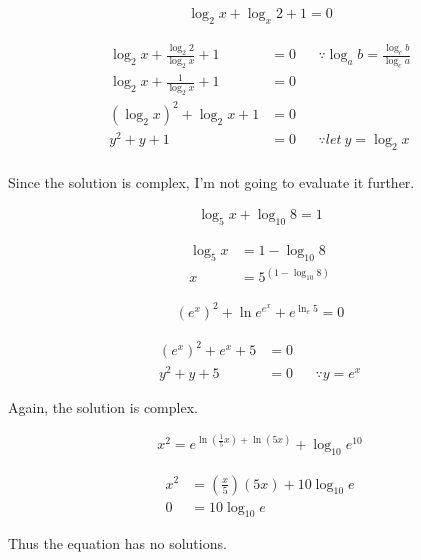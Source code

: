 \documentclass[a4paper]{article}
\begin{document}
\begin{question}
\begin{align*}
\log_2 x + \log_x 2 +1 = 0
\end{align*}
\end{question}

\begin{align*}
\log_2 x + \frac{\log_2 2}{\log_2 x} +1 &=0 && \because \log_ab = \frac{\log_c b}{\log_c a} \\
\log_2 x + \frac{1}{\log_2x} +1 &= 0 \\
(\log_2x)^2 + \log_2 x+ 1 &= 0 \\
y^2 + y + 1 &=0 && \because let\ y =\log_2 x \\
\end{align*}

Since the solution is complex, I'm not going to evaluate it further.

\begin{question}
\begin{align*}
\log_5 x+ \log_{10}8 = 1
\end{align*}
\end{question}

\begin{align*}
\log_5x &= 1- \log_{10}8 \\
x &= 5^{(1-\log_{10} 8)}
\end{align*}

\begin{question}
\begin{align*}
(e^x)^2 + \ln e^{e^x} + e^{\ln_e 5} = 0
\end{align*}
\end{question}

\begin{align*}
(e^x)^2 + e^x + 5 &= 0 \\
y^2 + y + 5 &= 0 && \because y = e^x
\end{align*}

Again, the solution is complex.

\begin{question}
\begin{align*}
x^2 = e^{\ln\left(\frac{1}{5}x\right)+ \ln(5x)} + \log_{10}e^{10}
\end{align*}
\end{question}

\begin{align*}
x^2 &= \left(\frac{x}{5}\right)(5x) + 10 \log_{10} e \\
0 &= 10\log_{10} {e}
\end{align*}

Thus the equation has no solutions.
\end{document}
